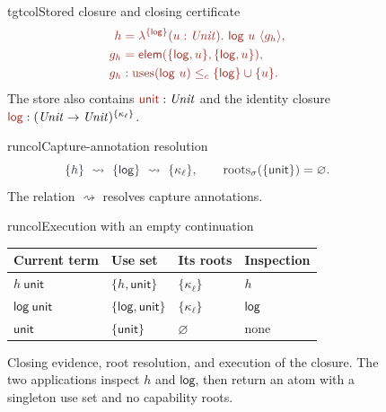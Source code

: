 \begin{figure}[!htbp]
\begin{examplepanel}{tgtcol}{Stored closure and closing certificate}
\[
\tgt{\begin{aligned}
 h&=\lambda^{\{\ev{log}\}}(u:\ty{Unit}).\
          \ev{log}\ u\ \langle g_h\rangle,\\
 g_h&=\ev{elem}(\{\ev{log},u\},\{\ev{log},u\}),\\
 g_h&:\uses{\ev{log}\ u}\le_c\{\ev{log}\}\cup\{u\}.
\end{aligned}}
\]
The store also contains \(\ev{unit}:\ty{Unit}\) and the identity closure
\(\ev{log}:(\ty{Unit}\to\ty{Unit})^{\{\kappa_\ell\}}\).
\end{examplepanel}
\begin{examplepanel}{runcol}{Capture-annotation resolution}
\[
\run{\{h\}\ \rightsquigarrow\ \{\mathsf{log}\}\
   \rightsquigarrow\ \{\kappa_\ell\},
   \qquad \operatorname{roots}_{\sigma}(\{\mathsf{unit}\})=\varnothing.}
\]
The relation \(\rightsquigarrow\) resolves capture annotations.
\end{examplepanel}
\begin{examplepanel}{runcol}{Execution with an empty continuation}
\small
\renewcommand{\arraystretch}{1.3}
\begin{tabularx}{\linewidth}{@{}lXll@{}}
\toprule
Current term & Use set & Its roots & Inspection\\
\midrule
$h\ \mathsf{unit}$ & $\{h,\mathsf{unit}\}$ & $\{\kappa_\ell\}$ & $h$\\
$\mathsf{log}\ \mathsf{unit}$ & $\{\mathsf{log},\mathsf{unit}\}$ & $\{\kappa_\ell\}$ & $\mathsf{log}$\\
$\mathsf{unit}$ & $\{\mathsf{unit}\}$ & $\varnothing$ & none\\
\bottomrule
\end{tabularx}
\end{examplepanel}
\caption{Closing evidence, root resolution, and execution of the closure.
The two applications inspect \(h\) and \(\mathsf{log}\), then return an
atom with a singleton use set and no capability roots.}
\label{fig:capture-call}
\end{figure}
